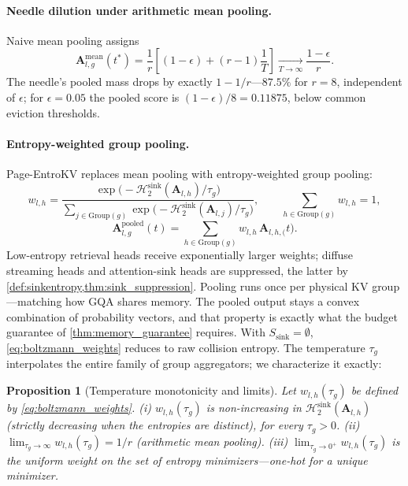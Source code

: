 \documentclass[final,5p,times,twocolumn]{elsarticle}
\newtheorem{proposition}{Proposition}
\theoremstyle{definition}
\theoremstyle{remark}
\newcommand{\method}{Page-EntroKV}
\newcommand{\Attn}[2]{\mathbf{A}_{#1,#2}}
\newcommand{\AttnPool}[2]{\mathbf{A}^{\mathrm{pooled}}_{#1,#2}}
\newcommand{\AttnMean}[2]{\mathbf{A}^{\mathrm{mean}}_{#1,#2}}
\newcommand{\CollisionSink}[1]{\mathcal{H}^{\mathrm{sink}}_{2}\!\left(#1\right)}
\newcommand{\Group}[1]{\mathrm{Group}(#1)}
\newcommand{\Ssink}{S_{\mathrm{sink}}}
\begin{document}
\paragraph{Needle dilution under arithmetic mean pooling.}
Naive mean pooling assigns
\begin{equation}
\AttnMean{l}{g}(t^{*})
= \frac{1}{r}\!\left[(1-\epsilon)+(r-1)\frac{1}{T}\right]
\xrightarrow[T\to\infty]{} \frac{1-\epsilon}{r}.
\label{eq:mean_dilution}
\end{equation}
The needle's pooled mass drops by exactly $1-1/r$---$87.5\%$ for
 $r=8$, independent of $\epsilon$; for $\epsilon=0.05$ the pooled score
is $(1-\epsilon)/8=0.11875$, below common eviction thresholds.

\paragraph{Entropy-weighted group pooling.}
\method{} replaces mean pooling with entropy-weighted group pooling:
\begin{equation}
w_{l,h}
= \frac{\exp\bigl(-\CollisionSink{\Attn{l}{h}}/\tau_g\bigr)}
       {\sum_{j \in \Group{g}}
        \exp\bigl(-\CollisionSink{\Attn{l}{j}}/\tau_g\bigr)},
\qquad
\textstyle\sum_{h \in \Group{g}} w_{l,h} = 1,
\label{eq:boltzmann_weights}
\end{equation}
\begin{equation}
\AttnPool{l}{g}(t)
= \sum_{h \in \Group{g}} w_{l,h}\,\Attn{l,h}(t).
\label{eq:pooled_attention}
\end{equation}
Low-entropy retrieval heads receive exponentially larger weights;
diffuse streaming heads and attention-sink heads are suppressed, the
latter by \cref{def:sinkentropy,thm:sink_suppression}. Pooling runs
once per physical KV group---matching how GQA shares memory. The pooled
output stays a convex combination of probability vectors, and that
property is exactly what the budget guarantee of
\cref{thm:memory_guarantee} requires. With $\Ssink=\emptyset$,
\cref{eq:boltzmann_weights} reduces to raw collision entropy. The
temperature $\tau_g$ interpolates the entire family of group
aggregators; we characterize it exactly:

\begin{proposition}[Temperature monotonicity and limits]
\label{prop:temperature_limits}
Let $w_{l,h}(\tau_g)$ be defined by \cref{eq:boltzmann_weights}.
\textup{(i)} $w_{l,h}(\tau_g)$ is non-increasing in
 $\CollisionSink{\Attn{l}{h}}$ (strictly decreasing when the entropies
are distinct), for every $\tau_g>0$.
\textup{(ii)} $\lim_{\tau_g \to \infty} w_{l,h}(\tau_g) = 1/r$ (arithmetic mean pooling).
\textup{(iii)} $\lim_{\tau_g \to 0^+} w_{l,h}(\tau_g)$ is the uniform
weight on the set of entropy minimizers---one-hot for a unique
minimizer.
\end{proposition}
\end{document}

